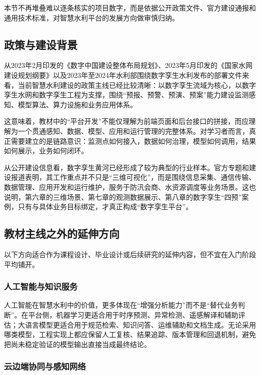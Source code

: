 本节不再堆叠难以逐条核实的项目数字，而是依据公开政策文件、官方建设通报和通用技术标准，对智慧水利平台的发展方向做审慎归纳。

\subsection{政策与建设背景}

从2023年2月印发的《数字中国建设整体布局规划》、2023年5月印发的《国家水网建设规划纲要》以及2023年至2024年水利部围绕数字孪生水利发布的部署文件来看，当前智慧水利建设的政策主线已经比较清晰：以数字孪生流域为核心，以数字孪生水网和数字孪生工程为支撑，围绕“预报、预警、预演、预案”能力建设监测感知、模型算法、算力设施和业务应用体系\cite{digitalChina2023,nationalWaterNetwork2023,twinWater2023,twinProject2024}。

这意味着，教材中的“平台开发”不能仅理解为前端页面和后台接口的拼接，而应理解为一个贯通感知、数据、模型、应用和运行管理的完整体系。对学习者而言，真正需要建立的是链路意识：监测点如何接入，数据如何治理，模型如何调用，结果如何展示，业务如何闭环。

从公开建设信息看，数字孪生黄河已经形成了较为典型的行业样本。官方专题和建设报道表明，其工作重点并不只是“三维可视化”，而是围绕信息采集、通信传输、数据管理、应用开发和运行维护，服务于防汛会商、水资源调度等业务场景\cite{twinYellowRiver2024,twinYellowRiverInfo2024}。这也说明，第六章的三维场景、第七章的观测数据展示、第八章的数字孪生“四预”案例，只有与具体业务目标绑定，才真正构成“数字孪生平台”。

\subsection{教材主线之外的延伸方向}

以下方向适合作为课程设计、毕业设计或后续研究的延伸内容，但不宜在入门阶段平均铺开。

\subsubsection{人工智能与知识服务}

人工智能在智慧水利中的价值，更多体现在“增强分析能力”而不是“替代业务判断”。在平台侧，机器学习更适合用于时序预测、异常检测、遥感解译和辅助评估；大语言模型更适合用于规范检索、知识问答、运维辅助和文档生成。无论采用哪类模型，工程实现上都应保留人工复核、结果追踪、版本管理和回退机制，避免把尚未稳定验证的模型输出直接当成最终结论。

\subsubsection{云边端协同与感知网络}

